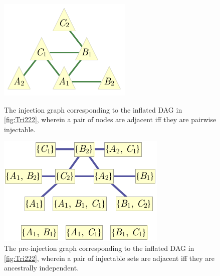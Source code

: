 {\begin{figure}[t]
\centering
\begin{minipage}[t]{0.3\linewidth}
\centering
\includegraphics[scale=1]{injectiongraph222.pdf}
\caption{The injection graph corresponding to the inflated DAG in \cref{fig:Tri222}, wherein a pair of nodes are adjacent iff they are pairwise injectable.}\label{fig:injection222}
\end{minipage}
\hfill
\begin{minipage}[t]{0.3\linewidth}
\centering
\includegraphics[scale=1]{preinjectiongraph222.pdf}
\caption{The pre-injection graph corresponding to the inflated DAG in \cref{fig:Tri222}, wherein a pair of injectable sets are adjacent iff they are ancestrally independent. }\label{fig:preinjectiongraph222}
\end{minipage}
\hfill
\begin{minipage}[t]{0.3\linewidth}
\centering

\end{minipage}
\end{figure}}
